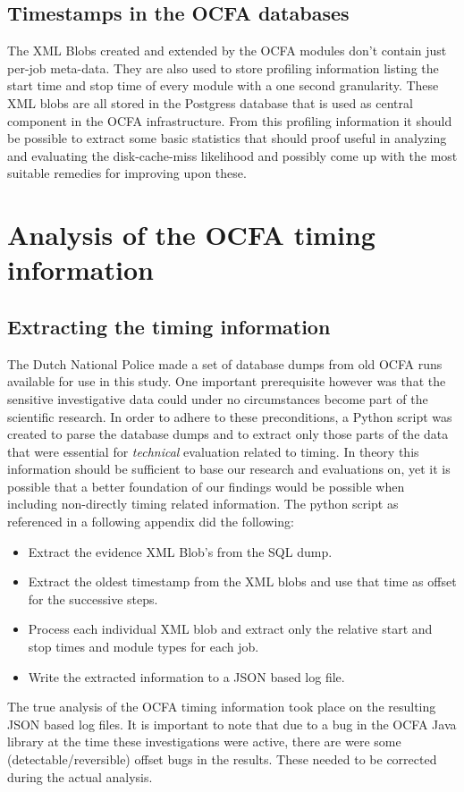 \subsection{Timestamps in the OCFA databases}
The XML Blobs created and extended by the OCFA modules don't contain just per-job meta-data. They are also used to store profiling information listing the start time and stop time of every module with a one second granularity.  These XML blobs are all stored in the Postgress database that is used as central component in the OCFA infrastructure. From this profiling information it should be possible to extract some basic statistics that should proof useful in analyzing and evaluating the disk-cache-miss likelihood and possibly come up with the most suitable remedies for improving upon these.
\section{Analysis of the OCFA timing information}
\subsection{Extracting the timing information}
The Dutch National Police made a set of database dumps from old OCFA runs available for use in this study. One important prerequisite however was that the sensitive investigative data could under no circumstances become part of the scientific research. In order to adhere to these preconditions, a Python script was created to parse the database dumps and to extract only those parts of the data that were essential for \emph{technical} evaluation related to timing. In theory this information should be sufficient to base our research and evaluations on, yet it is possible that a better foundation of our findings would be possible when including non-directly timing related information. The python script as referenced in a following appendix did the following:
\begin{itemize}
\item Extract the evidence XML Blob's from the SQL dump.
\item Extract the oldest timestamp from the XML blobs and use that time as offset for the successive steps.
\item Process each individual XML blob and extract only the relative start and stop times and module types for each job.
\item Write the extracted information to a JSON based log file.
\end{itemize}
The true analysis of the OCFA timing information took place on the resulting JSON based log files. It is important to note that due to a bug in the OCFA Java library at the time these investigations were active, there are were some (detectable/reversible) offset bugs in the results. These needed to be corrected during the actual analysis.




